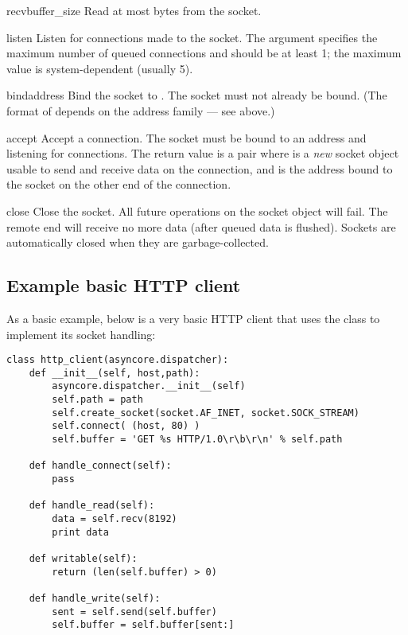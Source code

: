 \begin{methoddesc}{recv}{buffer_size}
  Read at most  bytes from the socket.
\end{methoddesc}

\begin{methoddesc}{listen}{}
  Listen for connections made to the socket.  The 
  argument specifies the maximum number of queued connections
  and should be at least 1; the maximum value is
  system-dependent (usually 5).
\end{methoddesc}

\begin{methoddesc}{bind}{address}
  Bind the socket to .  The socket must not already
  be bound.  (The format of  depends on the address
  family --- see above.)
\end{methoddesc}

\begin{methoddesc}{accept}{}
  Accept a connection.  The socket must be bound to an address
  and listening for connections.  The return value is a pair
   where  is a
  \emph{new} socket object usable to send and receive data on
  the connection, and  is the address bound to the
  socket on the other end of the connection.
\end{methoddesc}

\begin{methoddesc}{close}{}
  Close the socket.  All future operations on the socket object
  will fail.  The remote end will receive no more data (after
  queued data is flushed).  Sockets are automatically closed
  when they are garbage-collected.
\end{methoddesc}


\subsection{Example basic HTTP client \label{asyncore-example}}

As a basic example, below is a very basic HTTP client that uses the 
 class to implement its socket handling:

\begin{verbatim}
class http_client(asyncore.dispatcher):
    def __init__(self, host,path):
        asyncore.dispatcher.__init__(self)
        self.path = path
        self.create_socket(socket.AF_INET, socket.SOCK_STREAM)
        self.connect( (host, 80) )
        self.buffer = 'GET %s HTTP/1.0\r\b\r\n' % self.path
        
    def handle_connect(self):
        pass
        
    def handle_read(self):
        data = self.recv(8192)
        print data
        
    def writable(self):
        return (len(self.buffer) > 0)
    
    def handle_write(self):
        sent = self.send(self.buffer)
        self.buffer = self.buffer[sent:]
\end{verbatim}
